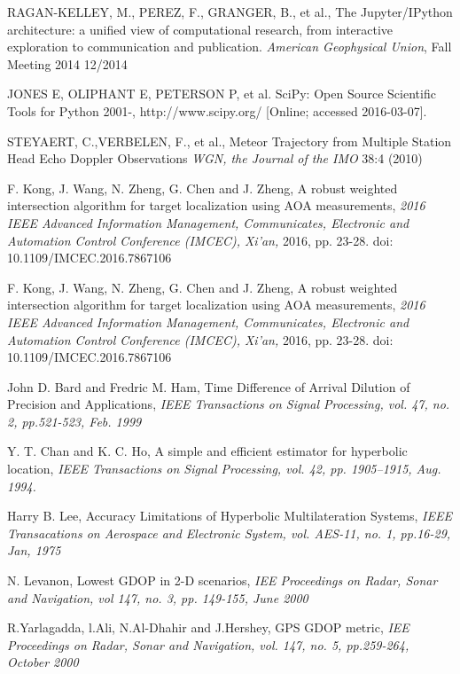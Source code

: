 \documentclass[twoside]{ctuthesis}
\theoremstyle{plain}
\theoremstyle{definition}
\theoremstyle{note}
\begin{document}
\begin{thebibliography}{99}
RAGAN-KELLEY, M., PEREZ, F., GRANGER, B., et al.,
The Jupyter/IPython architecture: a unified view of computational research, from interactive exploration to communication and publication.
\emph{American Geophysical Union}, Fall Meeting 2014
12/2014

JONES E, OLIPHANT E, PETERSON P, et al.
SciPy: Open Source Scientific Tools for Python
2001-, http://www.scipy.org/ [Online; accessed 2016-03-07].

STEYAERT, C.,VERBELEN, F., et al.,
Meteor Trajectory from Multiple Station Head Echo Doppler Observations
\emph{WGN, the Journal of the IMO} 38:4 (2010)

F. Kong, J. Wang, N. Zheng, G. Chen and J. Zheng,
A robust weighted intersection algorithm for target localization using AOA measurements,
\emph{2016 IEEE Advanced Information Management, Communicates, Electronic and Automation Control Conference (IMCEC), Xi'an,}  2016, pp. 23-28. doi: 10.1109/IMCEC.2016.7867106

F. Kong, J. Wang, N. Zheng, G. Chen and J. Zheng, 
A robust weighted intersection algorithm for target localization using AOA measurements,
\emph{2016 IEEE Advanced Information Management, Communicates, Electronic and Automation Control Conference (IMCEC), Xi'an,} 2016, pp. 23-28. doi: 10.1109/IMCEC.2016.7867106

John D. Bard and Fredric M. Ham,
Time Difference of Arrival Dilution of Precision and Applications,
\emph{IEEE Transactions on Signal Processing, vol. 47, no. 2, pp.521-523, Feb. 1999}

Y. T. Chan and K. C. Ho, 
A simple and efficient estimator for hyperbolic location,
\emph{IEEE Transactions on Signal Processing, vol. 42, pp. 1905–1915, Aug. 1994.}

Harry B. Lee, Accuracy Limitations of Hyperbolic Multilateration Systems,
\emph{IEEE Transacations on Aerospace and Electronic System, vol. AES-11, no. 1, pp.16-29, Jan, 1975}

N. Levanon,
Lowest GDOP in 2-D scenarios,
\emph{IEE Proceedings on Radar, Sonar and Navigation, vol 147, no. 3, pp. 149-155, June 2000}

R.Yarlagadda, l.Ali, N.Al-Dhahir and J.Hershey, 
GPS GDOP metric,
\emph{IEE Proceedings on Radar, Sonar and Navigation, vol. 147, no. 5, pp.259-264, October 2000}


\end{thebibliography}
\end{document}

